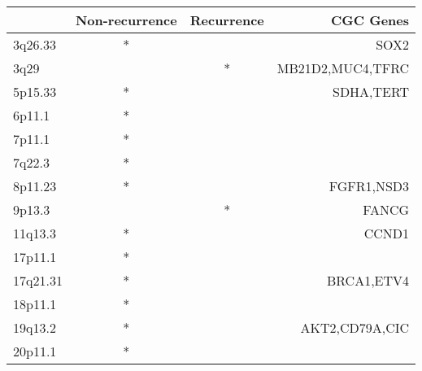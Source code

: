 \begin{tabular}{lccr}
\toprule
{} & Non-recurrence & Recurrence &         CGC Genes \\
\midrule
3q26.33  &              * &            &              SOX2 \\
3q29     &                &          * &  MB21D2,MUC4,TFRC \\
5p15.33  &              * &            &         SDHA,TERT \\
6p11.1   &              * &            &                   \\
7p11.1   &              * &            &                   \\
7q22.3   &              * &            &                   \\
8p11.23  &              * &            &        FGFR1,NSD3 \\
9p13.3   &                &          * &             FANCG \\
11q13.3  &              * &            &             CCND1 \\
17p11.1  &              * &            &                   \\
17q21.31 &              * &            &        BRCA1,ETV4 \\
18p11.1  &              * &            &                   \\
19q13.2  &              * &            &    AKT2,CD79A,CIC \\
20p11.1  &              * &            &                   \\
\bottomrule
\end{tabular}
